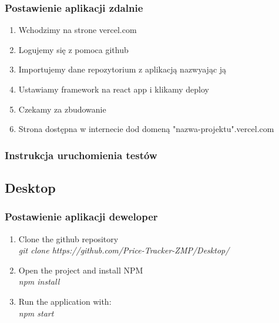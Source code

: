 \documentclass{article}
\begin{document}
        \subsubsection{Postawienie aplikacji zdalnie}
         \begin{enumerate}
            \item Wchodzimy na strone vercel.com\\
            \item Logujemy się z pomoca github\\
            \item Importujemy dane repozytorium z aplikacją nazwyając ją\\
            \item Ustawiamy framework na react app i klikamy deploy\\
            \item Czekamy za zbudowanie\\
            \item Strona dostępna w internecie dod domeną "nazwa-projektu".vercel.com\\
        \end{enumerate}
        
        
        \subsubsection{Instrukcja uruchomienia testów}
        
    \subsection{Desktop}
        \subsubsection{Postawienie aplikacji deweloper}
        \begin{enumerate}
            \item Clone the github repository\\
                        \emph{git clone https://github.com/Price-Tracker-ZMP/Desktop/} \\
            \item Open the project and install NPM\\
              \emph{npm install} \\
            \item Run the application with:\\
                \emph{npm start} \\
        \end{enumerate}
   
\end{document}
